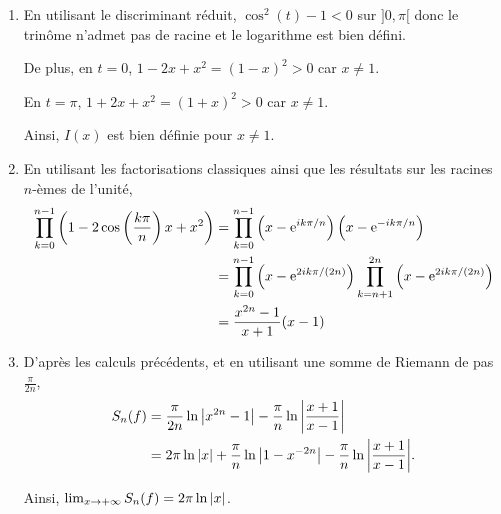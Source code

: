 \begin{solution}
\begin{enumerate}
\item En utilisant le discriminant réduit, $\cos^2(t) - 1 < 0$ sur $]0,\pi[$ donc le trinôme n'admet pas de racine et le logarithme est bien défini.

De plus, en $t = 0$, $1 - 2 x + x^2 = (1 - x)^2 > 0$ car $x \neq 1$.

En $t = \pi$, $1 + 2 x + x^2 = (1 + x)^2 > 0$ car $x \neq 1$.

Ainsi, $I(x)$ est bien définie pour $x \neq 1$.

\item En utilisant les factorisations classiques ainsi que les résultats sur les racines $n$-èmes de l'unité,
\begin{align*}
\prod_{k=0}^{n-1} \left(1 - 2 \cos\left(\frac{k\pi}{n}\right) x + x^2\right)
&= \prod_{k=0}^{n-1} \left(x - \mathrm{e}^{ik\pi/n}\right) \left(x - \mathrm{e}^{-ik\pi/n}\right) \\
&= \prod_{k=0}^{n-1} \left(x - \mathrm{e}^{2ik\pi/(2n)}\right) \prod_{k=n+1}^{2n} \left(x - \mathrm{e}^{2ik\pi/(2n)}\right) \\
&= \frac{x^{2n} - 1}{x + 1} (x - 1)
\end{align*}

\item D'après les calculs précédents, et en utilisant une somme de Riemann de pas $\frac{\pi}{2n}$,
\begin{align*}
S_n(f) &= \frac{\pi}{2n} \ln\abs{x^{2n}-1} - \frac{\pi}{n} \ln \abs{\frac{x+1}{x-1}} \\
&= 2 \pi \ln\abs{x} + \frac{\pi}{n} \ln \abs{1 - x^{-2n}} - \frac{\pi}{n} \ln \abs{\frac{x+1}{x-1}}.
\end{align*}

Ainsi, $\lim_{x\to +\infty} S_n(f) = 2 \pi \ln\abs{x}$.


\end{enumerate}
\end{solution}
